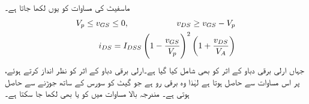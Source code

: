 ماسفیٹ کی مساوات  کو یوں لکھا جاتا ہے۔
\begin{gather}
\begin{aligned} \label{مساوات_منفی_فیٹ_افزائندہ}
V_p \le v_{GS} \le 0, \hspace{2 cm} v_{DS} \ge v_{GS}-V_p\\
i_{DS}=I_{DSS} \left(1-\frac{v_{GS}}{V_p} \right)^2 \left(1+\frac{v_{DS}}{V_A} \right)
\end{aligned}
\end{gather}
جہاں ارلی برقی دباو  کے اثر کو بھی شامل کیا گیا ہے۔ارلی برقی دباو کے اثر کو نظر انداز کرتے ہوئے،  پر اس مساوات سے  حاصل ہوتا ہے لہٰذا  وہ برقی رو ہے جو گیٹ کو سورس کے ساتھ جوڑنے سے حاصل ہوتی ہے۔ مندرجہ بالا مساوات میں   کو  یا  بھی لکھا جا سکتا ہے۔

